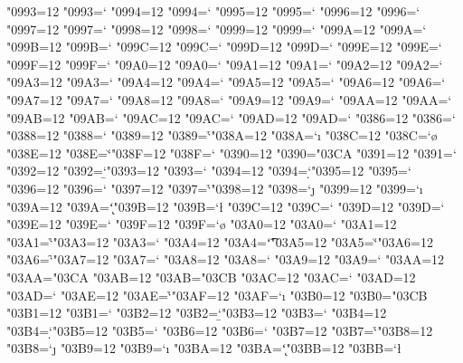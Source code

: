 \catcode"0993=12 \lccode"0993=`\w
\catcode"0994=12 \lccode"0994=`\w
\catcode"0995=12 \lccode"0995=`\w
\catcode"0996=12 \lccode"0996=`\w
\catcode"0997=12 \lccode"0997=`\w
\catcode"0998=12 \lccode"0998=`\w
\catcode"0999=12 \lccode"0999=`\w
\catcode"099A=12 \lccode"099A=`\w
\catcode"099B=12 \lccode"099B=`\w
\catcode"099C=12 \lccode"099C=`\w
\catcode"099D=12 \lccode"099D=`\w
\catcode"099E=12 \lccode"099E=`\w
\catcode"099F=12 \lccode"099F=`\w
\catcode"09A0=12 \lccode"09A0=`\w
\catcode"09A1=12 \lccode"09A1=`\w
\catcode"09A2=12 \lccode"09A2=`\w
\catcode"09A3=12 \lccode"09A3=`\w
\catcode"09A4=12 \lccode"09A4=`\w
\catcode"09A5=12 \lccode"09A5=`\w
\catcode"09A6=12 \lccode"09A6=`\w
\catcode"09A7=12 \lccode"09A7=`\w
\catcode"09A8=12 \lccode"09A8=`\w
\catcode"09A9=12 \lccode"09A9=`\w
\catcode"09AA=12 \lccode"09AA=`\w
\catcode"09AB=12 \lccode"09AB=`\w
\catcode"09AC=12 \lccode"09AC=`\w
\catcode"09AD=12 \lccode"09AD=`\w
\catcode"0386=12 \lccode"0386=`\a
\catcode"0388=12 \lccode"0388=`\e
\catcode"0389=12 \lccode"0389=`\h
\catcode"038A=12 \lccode"038A=`\i
\catcode"038C=12 \lccode"038C=`\o
\catcode"038E=12 \lccode"038E=`\u
\catcode"038F=12 \lccode"038F=`\w
\catcode"0390=12 \lccode"0390="03CA
\catcode"0391=12 \lccode"0391=`\a
\catcode"0392=12 \lccode"0392=`\b
\catcode"0393=12 \lccode"0393=`\g
\catcode"0394=12 \lccode"0394=`\d
\catcode"0395=12 \lccode"0395=`\e
\catcode"0396=12 \lccode"0396=`\z
\catcode"0397=12 \lccode"0397=`\h
\catcode"0398=12 \lccode"0398=`\j
\catcode"0399=12 \lccode"0399=`\i
\catcode"039A=12 \lccode"039A=`\k
\catcode"039B=12 \lccode"039B=`\l
\catcode"039C=12 \lccode"039C=`\m
\catcode"039D=12 \lccode"039D=`\n
\catcode"039E=12 \lccode"039E=`\x
\catcode"039F=12 \lccode"039F=`\o
\catcode"03A0=12 \lccode"03A0=`\p
\catcode"03A1=12 \lccode"03A1=`\r
\catcode"03A3=12 \lccode"03A3=`\s
\catcode"03A4=12 \lccode"03A4=`\t
\catcode"03A5=12 \lccode"03A5=`\u
\catcode"03A6=12 \lccode"03A6=`\f
\catcode"03A7=12 \lccode"03A7=`\q
\catcode"03A8=12 \lccode"03A8=`\y
\catcode"03A9=12 \lccode"03A9=`\w
\catcode"03AA=12 \lccode"03AA="03CA
\catcode"03AB=12 \lccode"03AB="03CB
\catcode"03AC=12 \lccode"03AC=`\a
\catcode"03AD=12 \lccode"03AD=`\e
\catcode"03AE=12 \lccode"03AE=`\h
\catcode"03AF=12 \lccode"03AF=`\i
\catcode"03B0=12 \lccode"03B0="03CB
\catcode"03B1=12 \lccode"03B1=`\a
\catcode"03B2=12 \lccode"03B2=`\b
\catcode"03B3=12 \lccode"03B3=`\g
\catcode"03B4=12 \lccode"03B4=`\d
\catcode"03B5=12 \lccode"03B5=`\e
\catcode"03B6=12 \lccode"03B6=`\z
\catcode"03B7=12 \lccode"03B7=`\h
\catcode"03B8=12 \lccode"03B8=`\j
\catcode"03B9=12 \lccode"03B9=`\i
\catcode"03BA=12 \lccode"03BA=`\k
\catcode"03BB=12 \lccode"03BB=`\l
